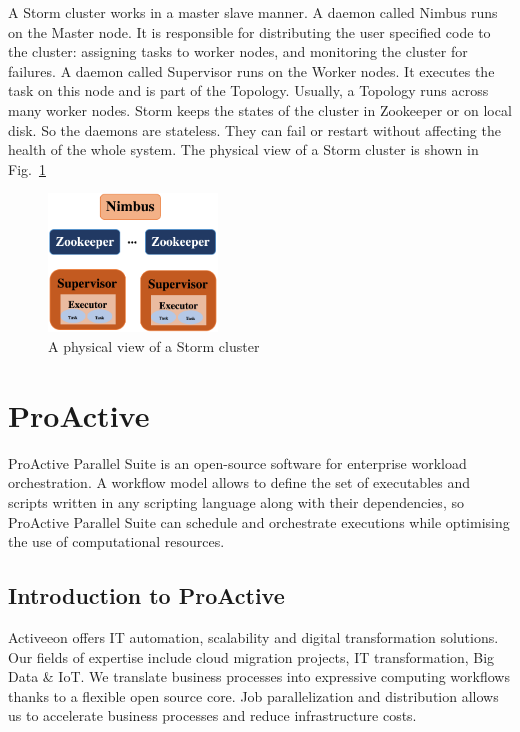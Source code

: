\documentclass[	DIV=calc,%
							paper=a4,%
							fontsize=11pt,%
							twocolumn]{scrartcl}	 					%
\newcommand{\initial}[1]{%
     \lettrine[lines=3,lhang=0.3,nindent=0em]{
     				\color{DarkBlue}
     				{\textsf{#1}}}{}}
\begin{document}
A Storm cluster works in a master slave manner. A daemon called Nimbus runs on the Master node. It is responsible for distributing the user specified code to the cluster: assigning tasks to worker nodes, and monitoring the cluster for failures. A daemon called Supervisor runs on the Worker nodes. It executes the task on this node and is part of the Topology. Usually, a Topology runs across many worker nodes. Storm keeps the states of the cluster in Zookeeper or on local disk. So the daemons are stateless. They can fail or restart without affecting the health of the whole system. The physical view of a Storm cluster is shown in Fig.~\ref{fig:stormcluster}

\begin{figure}
  \centering
    \includegraphics[width=0.4\textwidth]{images/stormcluster.png}
    \caption{A physical view of a Storm cluster}
    \label{fig:stormcluster}   
\end{figure}

\section*{\color{DarkOrange} ProActive}

\initial{P}roActive Parallel Suite is an open-source software for enterprise workload orchestration. A workflow model allows to define the set of executables and scripts written in any scripting language along with their dependencies, so ProActive Parallel Suite can schedule and orchestrate executions while optimising the use of computational resources.


\subsection*{Introduction to ProActive}

Activeeon \cite{Activeeon} offers IT automation, scalability and digital transformation solutions. Our fields of expertise include cloud migration projects, IT transformation, Big Data \& IoT. We translate business processes into expressive computing workflows thanks to a flexible open source core. Job parallelization and distribution allows us to accelerate business processes and reduce infrastructure costs.
\end{document}
